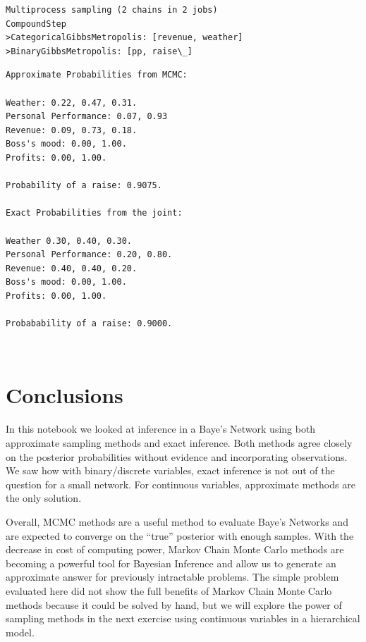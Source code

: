 \documentclass[12pt]{article}
\begin{document}
    \begin{Verbatim}[commandchars=\\\{\}]
Multiprocess sampling (2 chains in 2 jobs)
CompoundStep
>CategoricalGibbsMetropolis: [revenue, weather]
>BinaryGibbsMetropolis: [pp, raise\_]

    \end{Verbatim}

    \begin{Verbatim}[commandchars=\\\{\}]
Approximate Probabilities from MCMC:

Weather: 0.22, 0.47, 0.31.
Personal Performance: 0.07, 0.93
Revenue: 0.09, 0.73, 0.18.
Boss's mood: 0.00, 1.00.
Profits: 0.00, 1.00.

Probability of a raise: 0.9075.

Exact Probabilities from the joint:

Weather 0.30, 0.40, 0.30.
Personal Performance: 0.20, 0.80.
Revenue: 0.40, 0.40, 0.20.
Boss's mood: 0.00, 1.00.
Profits: 0.00, 1.00.

Probabability of a raise: 0.9000.

    \end{Verbatim}

    \begin{center}
    \end{center}
    { \hspace*{\fill} \\}
    
    \hypertarget{conclusions}{%
\section{Conclusions}\label{conclusions}}

In this notebook we looked at inference in a Baye's Network using both
approximate sampling methods and exact inference. Both methods agree
closely on the posterior probabilities without evidence and
incorporating observations. We saw how with binary/discrete variables,
exact inference is not out of the question for a small network. For
continuous variables, approximate methods are the only solution.

Overall, MCMC methods are a useful method to evaluate Baye's Networks
and are expected to converge on the ``true'' posterior with enough
samples. With the decrease in cost of computing power, Markov Chain
Monte Carlo methods are becoming a powerful tool for Bayesian Inference
and allow us to generate an approximate answer for previously
intractable problems. The simple problem evaluated here did not show the
full benefits of Markov Chain Monte Carlo methods because it could be
solved by hand, but we will explore the power of sampling methods in the
next exercise using continuous variables in a hierarchical model.


    
    
    
    
\end{document}
